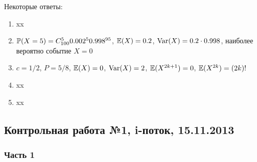 Некоторые ответы:
\begin{enumerate}
\item xx
\item $\P(X=5)=C_{100}^5 0.002^5 0.998^{95}$, $\E(X)=0.2$, $\Var(X)=0.2\cdot 0.998$, наиболее вероятно событие $X=0$
\item $c=1/2$, $P=5/8$, $\E(X)=0$, $\Var(X)=2$, $\E(X^{2k+1})=0$, $\E(X^{2k})=(2k)!$
\item xx
\item xx
\end{enumerate}



\subsection{Контрольная работа №1, i-поток, 15.11.2013}

\subsubsection*{Часть 1}

